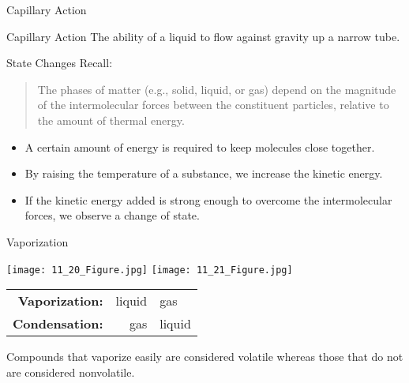 \documentclass[notes=hide]{beamer}
\begin{document}

\begin{frame}[t]{Capillary Action}
	\begin{block}{Capillary Action}
		The ability of a liquid to flow against gravity up a narrow
		tube.
	\end{block}

	\bigskip


\end{frame}

\begin{frame}{State Changes}
	Recall:\par\medskip\par
	\begin{quote}
		The phases of matter (e.g., solid, liquid, or gas) depend on the
		magnitude of the intermolecular forces between the constituent
		particles, relative to the amount of thermal energy.
	\end{quote}

	\bigskip

	\begin{itemize}[<+(1)->]
		\item A certain amount of energy is required to keep molecules
			close together.
		\item By raising the temperature of a substance, we increase the
			\alert{kinetic energy}.
		\item If the kinetic energy added is strong enough to overcome
			the intermolecular forces, we observe a \alert{change of
			state}.
	\end{itemize}
\end{frame}

\begin{frame}{Vaporization}
	\begin{center}
		\texttt{[image: 11\_20\_Figure.jpg]}
		\qquad
		\texttt{[image: 11\_21\_Figure.jpg]}

		\bigskip

		\begin{tabular} {>{\bfseries}r r@{ → }l}
			Vaporization: & liquid & gas \\
			Condensation: & gas & liquid
		\end{tabular}
	\end{center}

	Compounds that vaporize easily are considered \alert{volatile} whereas
	those that do not are considered \alert{nonvolatile}.
\end{frame}
\end{document}
